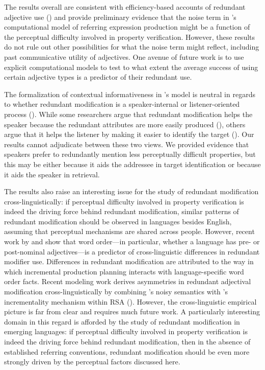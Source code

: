 \documentclass[12pt,letterpaper]{article}
\begin{document}
The results overall are consistent with efficiency-based accounts of redundant adjective use (\citealt{RubioFernandez2016,DegenEtAl2020}) and provide preliminary evidence that the noise term in \citet{DegenEtAl2020}'s computational model of referring expression production might be a function of the perceptual difficulty involved in property verification. However, these results do not rule out other possibilities for what the noise term might reflect, including past communicative utility of adjectives. One avenue of future work is to use explicit computational models to test to what extent the average success of using certain adjective types is a predictor of their redundant use. 

The formalization of contextual informativeness in \citet{DegenEtAl2020}'s model is neutral in regards to whether redundant modification is a speaker-internal or listener-oriented process (\citealt{Arnold2008}). While some researchers argue that redundant modification helps the speaker because the redundant attributes are more easily produced (\citealt{DaviesKatsos2013, KoolenEtAl2013}), others argue that it helps the listener by making it easier to identify the target (\citealt{FussellKraus1989a, ArtsEtAl2011,RubioFernandez2016,Rehrig2021}). Our results cannot adjudicate between these two views. We provided evidence that speakers prefer to redundantly mention less perceptually difficult properties, but this may be either because it aids the addressee in target identification or because it aids the speaker in retrieval. 

The results also raise an interesting issue for the study of redundant modification cross-linguistically: if perceptual difficulty involved in property verification is indeed the driving force behind redundant modification, similar patterns of redundant modification should be observed in languages besides English, assuming that perceptual mechanisms are shared across people. However, recent work by \citet{Rubio2020} and \citet{WuGibson2021} show that word order---in particular, whether a language has pre- or post-nominal adjectives---is a predictor of  cross-linguistic differences in redundant modifier use. Differences in redundant modification are attributed to the way in which incremental production planning interacts with language-specific word order facts. Recent modeling work  derives asymmetries in redundant adjectival modification cross-linguistically by combining \citet{DegenEtAl2020}'s noisy semantics with \citet{CohnGordon2018}'s incrementality mechanism within RSA (\citealt{WaldonDegen2021}). However, the cross-linguistic empirical picture is far from clear and requires much future work. A particularly interesting domain in this regard is afforded by the study of redundant modification in emerging languages: if perceptual difficulty involved in property verification is indeed the driving force behind redundant modification, then in the absence of established referring conventions, redundant modification should be even more strongly driven by the perceptual factors discussed here.
\end{document}
